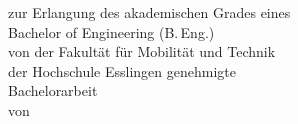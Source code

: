 \begin{titlepage}
  \centering

  \vspace*{5cm} %

  {\SuperHuge \thetitle\par}  %



    


  \vfill

  {\large zur Erlangung des akademischen Grades eines\\}
  \vspace*{0.3cm}
  {\LARGE Bachelor of Engineering (B.\,Eng.)\\}
  \vspace*{0.8cm}
  {\large von der Fakultät für Mobilität und Technik\\
  der Hochschule Esslingen genehmigte\\}
  \vspace*{0.2cm}
  {\LARGE Bachelorarbeit\\}
  \vspace*{0.1cm}
  {\large von\\}
  \vspace*{0.06cm}
  {\LARGE \theauthor\\}   %
  \vfill


\end{titlepage}
